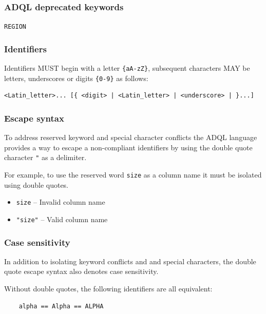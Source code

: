 \documentclass[11pt,a4paper]{ivoa}
\begin{document}
\subsubsection{ADQL deprecated keywords}
\label{sec:adql.depwords}

\noindent
\texttt{REGION}

\subsubsection{Identifiers}
\label{sec:adql.identifiers}

Identifiers MUST begin with a letter
\verb:{aA-zZ}:, subsequent characters MAY be letters, underscores or
digits \verb:{0-9}: as follows:

\begin{verbatim}
<Latin_letter>... [{ <digit> | <Latin_letter> | <underscore> | }...]
\end{verbatim}

\subsubsection{Escape syntax}
\label{sec:adql.escape}

To address reserved keyword and special character conflicts the ADQL language
provides a way to escape a non-compliant identifiers by using the double
quote character \verb:": as a delimiter.

For example, to use the reserved word \verb:size: as a column name
it must be isolated using double quotes.

\begin{itemize}
    \item \verb:size: -- Invalid column name
    \item \verb:"size": -- Valid column name
\end{itemize}

\subsubsection{Case sensitivity}
\label{sec:adql.case}

In addition to isolating keyword conflicts and and special characters,
the double quote escape syntax also denotes case sensitivity.

Without double quotes, the following identifiers are all equivalent:
\begin{verbatim}
    alpha == Alpha == ALPHA
\end{verbatim}
\end{document}
